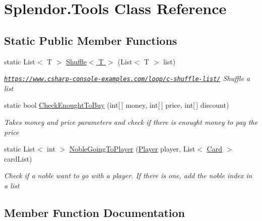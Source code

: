 \hypertarget{class_splendor_1_1_tools}{}\section{Splendor.\+Tools Class Reference}
\label{class_splendor_1_1_tools}
\subsection*{Static Public Member Functions}
\begin{DoxyCompactItemize}
\item 
static List$<$ T $>$ \hyperlink{class_splendor_1_1_tools_a0d5b64a510a1553cdbc840a0b01ffb3e}{Shuffle$<$ T $>$} (List$<$ T $>$ list)
\begin{DoxyCompactList}\small\item\em \href{https://www.csharp-console-examples.com/loop/c-shuffle-list/}{\tt https\+://www.\+csharp-\/console-\/examples.\+com/loop/c-\/shuffle-\/list/} Shuffle a list \end{DoxyCompactList}\item 
static bool \hyperlink{class_splendor_1_1_tools_af5f2810a45e5a85145a87ab9074de46b}{Check\+Enought\+To\+Buy} (int\mbox{[}$\,$\mbox{]} money, int\mbox{[}$\,$\mbox{]} price, int\mbox{[}$\,$\mbox{]} discount)
\begin{DoxyCompactList}\small\item\em Takes money and price parameters and check if there is enought money to pay the price \end{DoxyCompactList}\item 
static List$<$ int $>$ \hyperlink{class_splendor_1_1_tools_ae21a6482f43b55bbcc38253d4f007da2}{Noble\+Going\+To\+Player} (\hyperlink{class_splendor_1_1_player}{Player} player, List$<$ \hyperlink{class_splendor_1_1_card}{Card} $>$ card\+List)
\begin{DoxyCompactList}\small\item\em Check if a noble want to go with a player. If there is one, add the noble index in a list \end{DoxyCompactList}\end{DoxyCompactItemize}


\subsection{Member Function Documentation}
\mbox{\label{class_splendor_1_1_tools_af5f2810a45e5a85145a87ab9074de46b}} 
